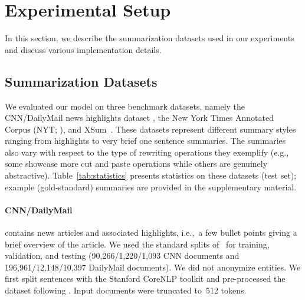 \documentclass[11pt,a4paper]{article}
\begin{document}
    
    
    \section{Experimental Setup}
    In this section, we describe the summarization datasets used in our
    experiments and discuss various implementation details.
    
    
    
    
    
    
    
    \subsection{Summarization Datasets}
    We evaluated our model on three benchmark datasets, namely the
    CNN/DailyMail news highlights dataset \cite{hermann2015teaching},
    the New York Times Annotated Corpus (NYT; \citealt{nytcorpus}),
    and XSum~\cite{xsum}. These datasets represent different summary
    styles ranging from highlights to very brief one sentence
    summaries. The summaries also vary with respect to the type of
    rewriting operations they exemplify (e.g., some showcase more cut
    and paste operations while others are genuinely
    abstractive). Table~\ref{tab:statistics} presents statistics on
    these datasets (test set); example (gold-standard) summaries are
    provided in the supplementary material.
    
    
    \paragraph{CNN/DailyMail} contains news articles and associated
    highlights, i.e.,~a few bullet points giving a brief overview of
    the article.  We used the standard splits
    of~\citet{hermann2015teaching} for training, validation, and
    testing (90,266/1,220/1,093 CNN documents and
    196,961/12,148/10,397 DailyMail documents). We did not anonymize
    entities.  We first split sentences with the Stanford CoreNLP
    toolkit \cite{manning-etal-2014-stanford} and pre-processed the
    dataset following \citet{see-acl17}.  Input documents were
    truncated to~512 tokens.
    
\end{document}
